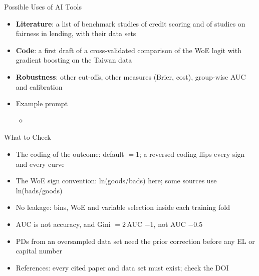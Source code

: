 \begin{frame}{Possible Uses of AI Tools}
\itemsize{\small}
\begin{itemize}
    \item \textbf{Literature}: a list of benchmark studies of credit scoring and of studies on fairness in lending, with their data sets
    \item \textbf{Code}: a first draft of a cross-validated comparison of the WoE logit with gradient boosting on the Taiwan data
    \item \textbf{Robustness}: other cut-offs, other measures (Brier, cost), group-wise AUC and calibration
    \item Example prompt
    \begin{itemize}
        \item {}
    \end{itemize}
\end{itemize}
\end{frame}

\begin{frame}{What to Check}
\itemsize{\small}
\begin{itemize}
    \item The coding of the outcome: default $= 1$; a reversed coding flips every sign and every curve
    \item The WoE sign convention: ln(goods/bads) here; some sources use ln(bads/goods)
    \item No leakage: bins, WoE and variable selection inside each training fold
    \item AUC is not accuracy, and Gini $= 2\,$AUC $- 1$, not AUC $- 0.5$
    \item PDs from an oversampled data set need the prior correction before any EL or capital number
    \item References: every cited paper and data set must exist; check the DOI
\end{itemize}
\end{frame}

